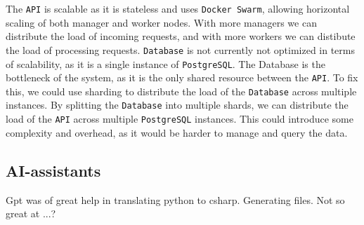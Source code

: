 The \texttt{API} is scalable as it is stateless and uses \texttt{Docker Swarm}, 
allowing horizontal scaling of both manager and worker nodes.
With more managers we can distribute the load of incoming requests,
and with more workers we can distibute the load of processing requests.
\texttt{Database} is not currently not optimized in terms of scalability, 
as it is a single instance of \texttt{PostgreSQL}.
The Database is the bottleneck of the system, as it is the only shared 
resource between the \texttt{API}.
To fix this, we could use sharding to distribute the load of the \texttt{Database} 
across multiple instances.
By splitting the \texttt{Database} into multiple shards, we can distribute 
the load of the \texttt{API} across multiple \texttt{PostgreSQL} instances.
This could introduce some complexity and overhead, as it would be harder 
to manage and query the data.

\subsection{AI-assistants}

Gpt was of great help in translating python to csharp.
Generating files.
Not so great at ...?